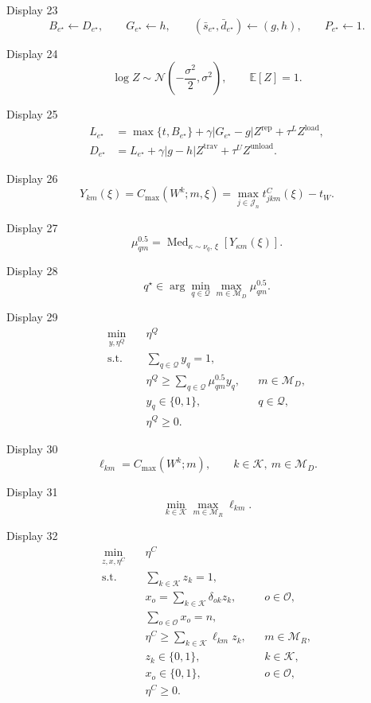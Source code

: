 \documentclass[a4paper,11pt]{article}
\begin{document}
\noindent Display 23
\[
B_{e^\star}\leftarrow D_{e^\star},\qquad
G_{e^\star}\leftarrow h,\qquad
(\bar s_{e^\star},\bar d_{e^\star})\leftarrow(g,h),\qquad
P_{e^\star}\leftarrow1.
\tag{23}
\]

\noindent Display 24
\[
\log Z\sim\mathcal N\left(-\frac{\sigma^2}{2},\sigma^2\right),
\qquad \mathbb E[Z]=1.
\tag{24}
\]

\noindent Display 25
\[
\begin{aligned}
L_{e^\star}&=\max\{t,B_{e^\star}\}
+\gamma|G_{e^\star}-g|Z^{\mathrm{rep}}
+\tau^L Z^{\mathrm{load}},\\
D_{e^\star}&=L_{e^\star}
+\gamma|g-h|Z^{\mathrm{trav}}
+\tau^U Z^{\mathrm{unload}}.
\end{aligned}
\tag{25}
\]

\noindent Display 26
\[
Y_{km}(\xi)
=C_{\max}(W^k;m,\xi)
=\max_{j\in\mathcal J_n}t^C_{jkm}(\xi)-t_W.
\tag{26}
\]

\noindent Display 27
\[
\mu_{qm}^{0.5}
=\operatorname{Med}_{\kappa\sim\nu_q,\,\xi}
\left[Y_{\kappa m}(\xi)\right].
\tag{27}
\]

\noindent Display 28
\[
q^\star\in
\arg\min_{q\in\mathcal Q}
\max_{m\in\mathcal M_D}\mu_{qm}^{0.5}.
\tag{28}
\]

\noindent Display 29
\[
\begin{aligned}
\min_{y,\eta^Q}\quad & \eta^Q\\
\text{s.t.}\quad
& \sum_{q\in\mathcal Q}y_q=1,\\
& \eta^Q\geq\sum_{q\in\mathcal Q}\mu_{qm}^{0.5}y_q,
&& m\in\mathcal M_D,\\
& y_q\in\{0,1\},
&& q\in\mathcal Q,\\
& \eta^Q\geq0.
\end{aligned}
\tag{29}
\]

\noindent Display 30
\[
\ell_{km}=C_{\max}(W^k;m),
\qquad k\in\mathcal K,\ m\in\mathcal M_D.
\tag{30}
\]

\noindent Display 31
\[
\min_{k\in\mathcal K}\max_{m\in\mathcal M_R}\ell_{km}.
\tag{31}
\]

\noindent Display 32
\[
\begin{aligned}
\min_{z,x,\eta^C}\quad & \eta^C\\
\text{s.t.}\quad
& \sum_{k\in\mathcal K}z_k=1,\\
& x_o=\sum_{k\in\mathcal K}\delta_{ok}z_k,
&& o\in\mathcal O,\\
& \sum_{o\in\mathcal O}x_o=n,\\
& \eta^C\geq\sum_{k\in\mathcal K}\ell_{km}z_k,
&& m\in\mathcal M_R,\\
& z_k\in\{0,1\},
&& k\in\mathcal K,\\
& x_o\in\{0,1\},
&& o\in\mathcal O,\\
& \eta^C\geq0.
\end{aligned}
\tag{32}
\]
\end{document}
